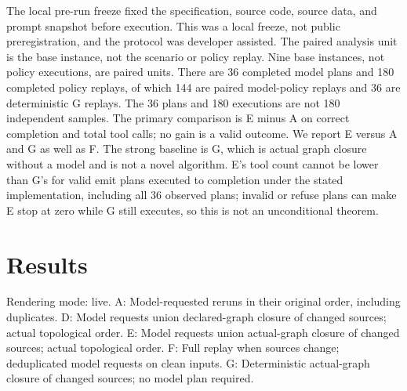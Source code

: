 \documentclass{article}
\begin{document}
The local pre-run freeze fixed the specification, source code, source data, and prompt snapshot before execution. This was a local freeze, not public preregistration, and the protocol was developer assisted. The paired analysis unit is the base instance, not the scenario or policy replay. Nine base instances, not policy executions, are paired units. There are 36 completed model plans and 180 completed policy replays, of which 144 are paired model-policy replays and 36 are deterministic G replays. The 36 plans and 180 executions are not 180 independent samples. The primary comparison is E minus A on correct completion and total tool calls; no gain is a valid outcome. We report E versus A and G as well as F. The strong baseline is G, which is actual graph closure without a model and is not a novel algorithm. E's tool count cannot be lower than G's for valid emit plans executed to completion under the stated implementation, including all 36 observed plans; invalid or refuse plans can make E stop at zero while G still executes, so this is not an unconditional theorem.

\section{Results}

Rendering mode: live. A: Model-requested reruns in their original order, including duplicates. D: Model requests union declared-graph closure of changed sources; actual topological order. E: Model requests union actual-graph closure of changed sources; actual topological order. F: Full replay when sources change; deduplicated model requests on clean inputs. G: Deterministic actual-graph closure of changed sources; no model plan required.
\end{document}
